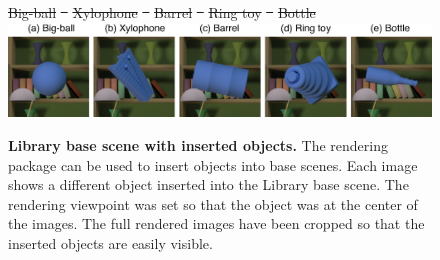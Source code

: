 \documentclass{jov}
\providecommand{\DIFdeltex}[1]{{\protect\color{red}\sout{#1}}}                      %
\providecommand{\DIFdelFL}[1]{\DIFdel{#1}} %
\providecommand{\DIFaddbeginFL}{} %
\providecommand{\DIFaddendFL}{} %
\providecommand{\DIFdelbeginFL}{} %
\providecommand{\DIFdelendFL}{} %
\providecommand{\DIFdel}[1]{\texorpdfstring{\DIFdeltex{#1}}{}} %
\newcommand{\DIFscaledelfig}{0.5}
\newlength{\DIFdelgraphicswidth} %
\newlength{\DIFdelgraphicsheight} %
\newcommand{\DIFaddincludegraphics}[2][]{{\color{blue}\fbox{\DIFOincludegraphics[#1]{#2}}}} %
\newcommand{\DIFdelincludegraphics}[2][]{%
\sbox{\DIFdelgraphicsbox}{\DIFOincludegraphics[#1]{#2}}%
\settoboxwidth{\DIFdelgraphicswidth}{\DIFdelgraphicsbox} %
\settoboxtotalheight{\DIFdelgraphicsheight}{\DIFdelgraphicsbox} %
\scalebox{\DIFscaledelfig}{%
\parbox[b]{\DIFdelgraphicswidth}{\usebox{\DIFdelgraphicsbox}\\[-\baselineskip] \rule{\DIFdelgraphicswidth}{0em}}\llap{\resizebox{\DIFdelgraphicswidth}{\DIFdelgraphicsheight}{%
\setlength{\unitlength}{\DIFdelgraphicswidth}%
\begin{picture}(1,1)%
\thicklines\linethickness{2pt} %
{\color[rgb]{1,0,0}\put(0,0){\framebox(1,1){}}}%
{\color[rgb]{1,0,0}\put(0,0){\line( 1,1){1}}}%
{\color[rgb]{1,0,0}\put(0,1){\line(1,-1){1}}}%
\end{picture}%
}\hspace*{3pt}}} %
} %
\DeclareRobustCommand{\DIFaddbeginFL}{\DIFOaddbeginFL \let\includegraphics\DIFaddincludegraphics} %
\DeclareRobustCommand{\DIFaddendFL}{\DIFOaddendFL \let\includegraphics\DIFOincludegraphics} %
\DeclareRobustCommand{\DIFdelbeginFL}{\DIFOdelbeginFL \let\includegraphics\DIFdelincludegraphics} %
\DeclareRobustCommand{\DIFdelendFL}{\DIFOaddendFL \let\includegraphics\DIFOincludegraphics} %
\begin{document}
\begin{figure}
\centering
\DIFdelbeginFL %
{%
\DIFdelFL{Big-ball}}
\DIFdelFL{~ 
    }%
{%
\DIFdelFL{Xylophone}}
\DIFdelFL{~ 
    }%
{%
\DIFdelFL{Barrel}}
\DIFdelFL{~
	}%
{%
\DIFdelFL{Ring toy}}
\DIFdelFL{~
    	}%
{%
\DIFdelFL{Bottle}}
\DIFdelendFL \DIFaddbeginFL \includegraphics{Figure3.eps}
\DIFaddendFL \caption{{\bf Library base scene with inserted objects.} The rendering package can be used to insert objects into base scenes. Each image shows a different object inserted into the Library base scene. The rendering viewpoint was set so that the object was at the center of the images. The full rendered images have been cropped so that the inserted objects are easily visible.}\label{fig:libraryWithTarget}
\end{figure}
\end{document}
